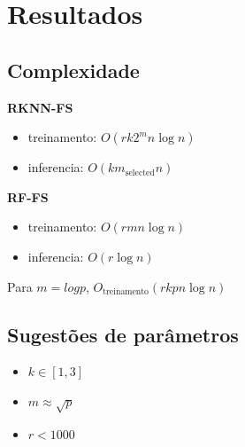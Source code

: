\section{Resultados}

\subsection{Complexidade}
\begin{frame}
\textbf{RKNN-FS}
\begin{itemize}
    \item treinamento: $ O(rk2^mn\log{n}) $
    \item inferencia: $ O(km_\text{selected}n) $
\end{itemize}

\vspace{0.5cm}

\textbf{RF-FS}
\begin{itemize}
    \item treinamento: $ O(rmn\log{n}) $
    \item inferencia: $ O(r\log{n}) $
\end{itemize}

\vspace{0.5cm}

Para $ m = log{p} $, $ O_{\text{treinamento}}(rkpn\log{n}) $

\end{frame}

\subsection{Sugestões de parâmetros}
\begin{frame}
\begin{itemize}
    \item $ k \in [1, 3] $
    \item $ m \approx \sqrt{p} $
    \item $ r < 1000 $
\end{itemize}
\end{frame}

